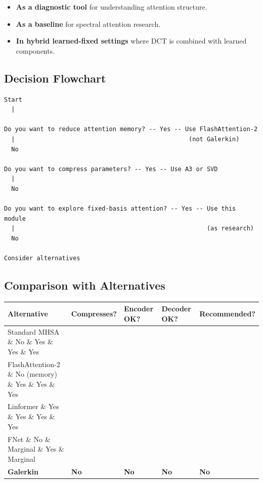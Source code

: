 \begin{itemize}
\item \textbf{As a diagnostic tool} for understanding attention structure.
\item \textbf{As a baseline} for spectral attention research.
\item \textbf{In hybrid learned-fixed settings} where DCT is combined with learned
  components.

\end{itemize}
\subsection{Decision Flowchart}

\begin{lstlisting}
Start
  |
   
Do you want to reduce attention memory? -- Yes -- Use FlashAttention-2
  |                                                (not Galerkin)
  No
   
Do you want to compress parameters? -- Yes -- Use A3 or SVD
  |
  No
   
Do you want to explore fixed-basis attention? -- Yes -- Use this module
  |                                                     (as research)
  No
   
Consider alternatives
\end{lstlisting}

\subsection{Comparison with Alternatives}

\begin{table}[H]
\centering
\small
\begin{tabular}{lllll}
\toprule
\textbf{Alternative} & \textbf{Compresses?} & \textbf{Encoder OK?} & \textbf{Decoder OK?} & \textbf{Recommended?} \\
\midrule
Standard MHSA \& No \& Yes \& Yes \& Yes \\
FlashAttention-2 \& No (memory) \& Yes \& Yes \& Yes \\
Linformer \& Yes \& Yes \& Yes \& Yes \\
FNet \& No \& Marginal \& Yes \& Marginal \\
\textbf{Galerkin} & \textbf{No} & \textbf{No} & \textbf{No} & \textbf{No} \\
\bottomrule
\end{tabular}
\end{table}

